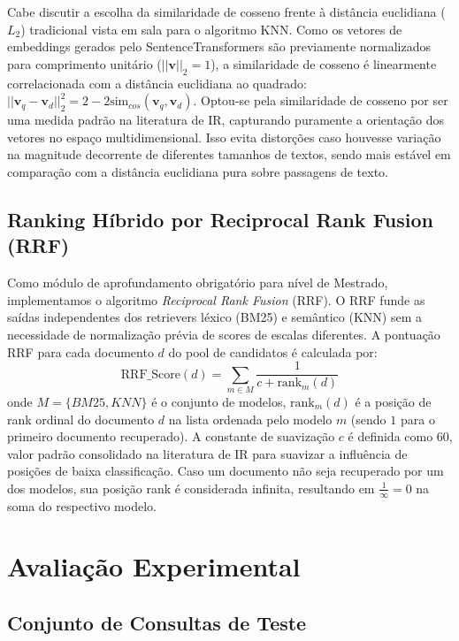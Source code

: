 \documentclass[12pt]{article}
\begin{document}
Cabe discutir a escolha da similaridade de cosseno frente à distância euclidiana ($L_2$) tradicional vista em sala para o algoritmo KNN. Como os vetores de embeddings gerados pelo SentenceTransformers são previamente normalizados para comprimento unitário ($||\mathbf{v}||_2 = 1$), a similaridade de cosseno é linearmente correlacionada com a distância euclidiana ao quadrado: $||\mathbf{v}_q - \mathbf{v}_d||_2^2 = 2 - 2 \text{sim}_{cos}(\mathbf{v}_q, \mathbf{v}_d)$. Optou-se pela similaridade de cosseno por ser uma medida padrão na literatura de IR, capturando puramente a orientação dos vetores no espaço multidimensional. Isso evita distorções caso houvesse variação na magnitude decorrente de diferentes tamanhos de textos, sendo mais estável em comparação com a distância euclidiana pura sobre passagens de texto.

\subsection{Ranking Híbrido por Reciprocal Rank Fusion (RRF)}

Como módulo de aprofundamento obrigatório para nível de Mestrado, implementamos o algoritmo \textit{Reciprocal Rank Fusion} (RRF). O RRF funde as saídas independentes dos retrievers léxico (BM25) e semântico (KNN) sem a necessidade de normalização prévia de scores de escalas diferentes. A pontuação RRF para cada documento $d$ do pool de candidatos é calculada por:
\begin{equation}
    \text{RRF\_Score}(d) = \sum_{m \in M} \frac{1}{c + \text{rank}_m(d)}
\end{equation}
onde $M = \{BM25, KNN\}$ é o conjunto de modelos, $\text{rank}_m(d)$ é a posição de rank ordinal do documento $d$ na lista ordenada pelo modelo $m$ (sendo $1$ para o primeiro documento recuperado). A constante de suavização $c$ é definida como $60$, valor padrão consolidado na literatura de IR para suavizar a influência de posições de baixa classificação. Caso um documento não seja recuperado por um dos modelos, sua posição rank é considerada infinita, resultando em $\frac{1}{\infty} = 0$ na soma do respectivo modelo.

\section{Avaliação Experimental}

\subsection{Conjunto de Consultas de Teste}
\end{document}
